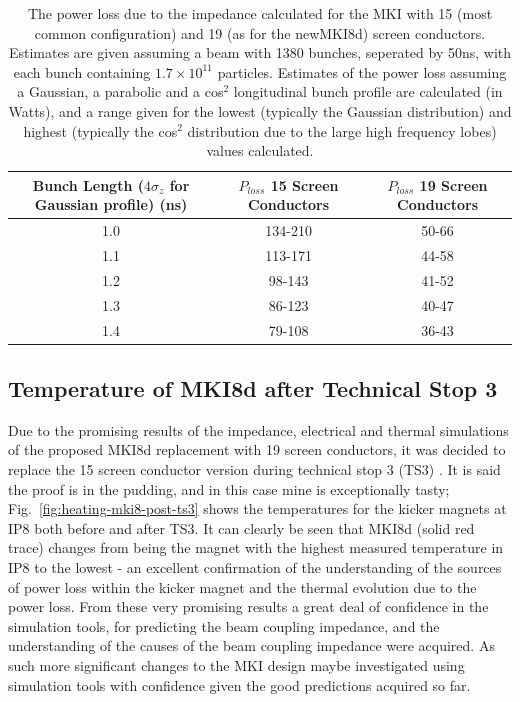 \begin{table}
\caption{The power loss due to the impedance calculated for the MKI with 15 (most common configuration) and 19 (as for the newMKI8d) screen conductors. Estimates are given assuming a beam with 1380 bunches, seperated by 50ns, with each bunch containing $1.7 \times 10^{11}$ particles. Estimates of the power loss assuming a Gaussian, a parabolic and a cos$^{2}$ longitudinal bunch profile are calculated (in Watts), and a range given for the lowest (typically the Gaussian distribution) and highest (typically the cos$^{2}$ distribution due to the large high frequency lobes) values calculated.}
\label{tab:heating-15-19-cond}
\begin{center}
\begin{tabular}{c | c | c}
Bunch Length ($4\sigma_{z}$ for Gaussian profile) (ns) & $P_{loss}$ 15 Screen Conductors & $P_{loss}$ 19 Screen Conductors \\ \hline
1.0 &  134-210 & 50-66 \\ \hline
1.1 &  113-171 & 44-58 \\ \hline
1.2 &  98-143 & 41-52 \\ \hline
1.3 &  86-123 & 40-47 \\ \hline
1.4 &  79-108 & 36-43 \\ \hline
\end{tabular}
\end{center}
\end{table}

\subsection{Temperature of MKI8d after Technical Stop 3}

Due to the promising results of the impedance, electrical and thermal simulations of the proposed MKI8d replacement with 19 screen conductors, it was decided to replace the 15 screen conductor version during technical stop 3 (TS3) \cite{Barnes:emisMKITemp}. It is said the proof is in the pudding, and in this case mine is exceptionally tasty; Fig.~\ref{fig:heating-mki8-post-ts3} shows the temperatures for the kicker magnets at IP8 both before and after TS3. It can clearly be seen that MKI8d (solid red trace) changes from being the magnet with the highest measured temperature in IP8 to the lowest - an excellent confirmation of the understanding of the sources of power loss within the kicker magnet and the thermal evolution due to the power loss. From these very promising results a great deal of confidence in the simulation tools, for predicting the beam coupling impedance, and the understanding of the causes of the beam coupling impedance were acquired. As such more significant changes to the MKI design maybe investigated using simulation tools with confidence given the good predictions acquired so far.

